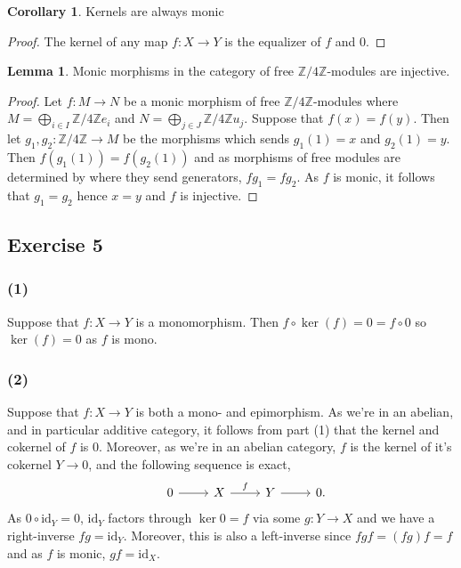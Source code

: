 \documentclass{article}
\theoremstyle{definition}
\newtheorem{corollary}[theorem]{Corollary}
\newtheorem{lemma}[theorem]{Lemma}
\newcommand{\Z}{\mathbb{Z}}
\newcommand{\id}{\text{id}}
\begin{document}
\begin{corollary}
	Kernels are always monic
\end{corollary}
\begin{proof}
	The kernel of any map $f : X \to Y$ is the equalizer of $f$ and $0$.	
\end{proof}

\begin{lemma}
	Monic morphisms in the category of free $\Z/4\Z$-modules are injective.
\end{lemma}
\begin{proof}
	Let $f : M \to N$ be a monic morphism of free $\Z/4\Z$-modules	where $M =
	\bigoplus_{i \in I} \Z/4\Z e_i$ and $N = \bigoplus_{j \in J} \Z/4\Z u_j$.
	Suppose that $f(x) = f(y)$. Then let $g_1, g_2 : \Z/4\Z \to M$ be the
	morphisms which sends $g_1(1) = x$ and $g_2(1) = y$. Then $f(g_1(1)) =
	f(g_2(1))$ and as morphisms of free modules are determined by where they
	send generators, $fg_1 = fg_2$. As $f$ is monic, it follows that $g_1 =
	g_2$ hence $x = y$ and $f$ is injective.
\end{proof}

\subsection*{Exercise 5}

\subsubsection*{(1)}

Suppose that $f : X \to Y$ is a monomorphism. Then $f \circ \ker(f) = 0 = f
\circ 0$ so $\ker(f) = 0$ as $f$ is mono.

\subsubsection*{(2)}

Suppose that $f : X \to Y$ is both a mono- and epimorphism. As we're in an
abelian, and in particular additive category, it follows from part (1) that the
kernel and cokernel of $f$ is $0$. Moreover, as we're in an abelian category,
$f$ is the kernel of it's cokernel $Y \to 0$, and the following sequence is
exact,
\[
\begin{tikzcd}
	& 0
	\ar{r}
	& X
	\ar{r}{f}
	& Y
	\ar{r}
	& 0.
\end{tikzcd}
\] 
As $0 \circ \id_Y = 0$, $\id_Y$ factors through $\ker 0 = f$ via some $g : Y
\to X$ and we have a right-inverse $fg = \id_Y$. Moreover, this is also a
left-inverse since $fgf = (fg)f = f$ and as $f$ is monic, $gf = \id_X$.
\end{document}
